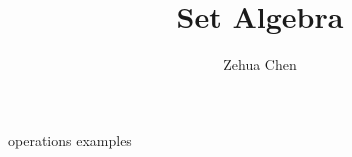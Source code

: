 \documentclass{../../../shared/latex/notes}
\title{Set Algebra}
\author{Zehua Chen}
\begin{document}
  \maketitle
  \tableofcontents

  {operations}
  {examples}

  \newpage
  \printglossaries
\end{document}
